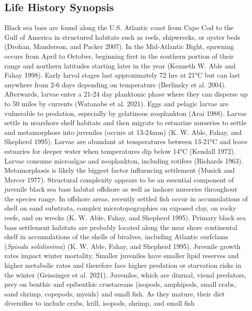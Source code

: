 \documentclass[
  letterpaper,
  DIV=11,
  numbers=noendperiod]{scrartcl}
\begin{document}
\subsection{Life History Synopsis}\label{life-history-synopsis}

Black sea bass are found along the U.S. Atlantic coast from Cape Cod to
the Gulf of America in structured habitats such as reefs, shipwrecks, or
oyster beds (Drohan, Manderson, and Packer 2007). In the Mid-Atlantic
Bight, spawning occurs from April to October, beginning first in the
southern portion of their range and northern latitudes starting later in
the year (Kenneth W. Able and Fahay 1998). Early larval stages last
approximately 72 hrs at 21°C but can last anywhere from 2-6 days
depending on temperature (Berlinsky et al. 2004). Afterwards, larvae
enter a 21-24 day planktonic phase where they can disperse up to 50
miles by currents (Watanabe et al. 2021). Eggs and pelagic larvae are
vulnerable to predation, especially by gelatinous zooplankton (Arai
1988). Larvae settle in nearshore shelf habitats and then migrate to
estuarine nurseries to settle and metamorphose into juveniles (occurs at
13-24mm) (K. W. Able, Fahay, and Shepherd 1995). Larvae are abundant at
temperatures between 13-21°C and leave estuaries for deeper water when
temperatures dip below 14°C (Kendall 1972). Larvae consume microalgae
and zooplankton, including rotifers (Richards 1963). Metamorphosis is
likely the biggest factor influencing settlement (Musick and Mercer
1977). Structural complexity appears to be an essential component of
juvenile black sea bass habitat offshore as well as inshore nurseries
throughout the species range. In offshore areas, recently settled fish
occur in accumulations of shell on sand substrata, complex
microtopographies on exposed clay, on rocky reefs, and on wrecks (K. W.
Able, Fahay, and Shepherd 1995). Primary black sea bass settlement
habitats are probably located along the near shore continental shelf in
accumulations of the shells of bivalves, including Atlantic surfclams
(\emph{Spisula solidissima}) (K. W. Able, Fahay, and Shepherd 1995).
Juvenile growth rates impact winter mortality. Smaller juveniles have
smaller lipid reserves and higher metabolic rates and therefore face
higher predation or starvation risks in the winter (Geissinger et al.
2021). Juveniles, which are diurnal, visual predators, prey on benthic
and epibenthic crustaceans (isopods, amphipods, small crabs, sand
shrimp, copepods, mysids) and small fish. As they mature, their diet
diversifies to include crabs, krill, isopods, shrimp, and small fish
\end{document}
